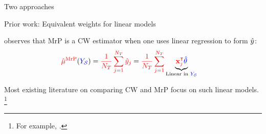 \begin{frame}[t]{Two approaches}
\end{frame}



\begin{frame}{Prior work: Equivalent weights for linear models}

\textcite{gelman:2007:struggles} observes that MrP is a CW estimator when
one uses linear regression to form $\hat{y}$:
$$
\begin{aligned}
\textcolor{red}{\hat{\mu}^{\mathrm{MrP}}}(\textcolor{blue}{\textcolor{blue}{Y_{\mathcal{S}}}}) ={}& \textcolor{red}{\frac{1}{{\textcolor{red}{N_T}}} \sum_{j=1}^{\textcolor{red}{N_T}} \hat{y}_j} =
\textcolor{red}{\frac{1}{{\textcolor{red}{N_T}}} \sum_{j=1}^{\textcolor{red}{N_T}} }
\underbrace{\textcolor{red}{\mathbf{x}_j^\intercal} \textcolor{blue}{\hat{\theta}}}_{\textrm{Linear in }\textcolor{blue}{\textcolor{blue}{Y_{\mathcal{S}}}}}
\end{aligned}
$$

Most existing literature on comparing CW and MrP focus on such linear models.
\footnote{
    For example,
    \textcite{gelman:2007:struggles,benmichael:2021:multilevel,chattopadhyay:2023:implied}.}

\vspace{1em}

\end{frame}







